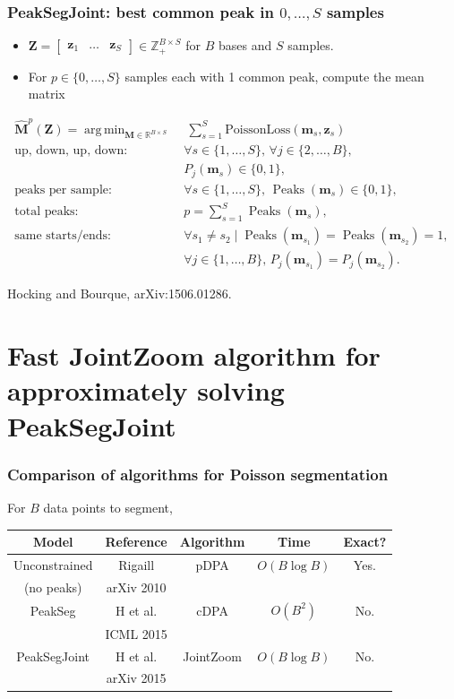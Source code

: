 \documentclass{beamer}
\DeclareMathOperator*{\argmin}{arg\,min}
\DeclareMathOperator*{\Peaks}{Peaks}
\newcommand{\RR}{\mathbb R}
\newcommand{\ZZ}{\mathbb Z}
\begin{document}
\begin{frame}
  \frametitle{PeakSegJoint: best common peak in $0, \dots, S$
    samples}

  \begin{itemize}
  \item $\mathbf Z = \left[
    \begin{array}{ccc}
      \mathbf z_1 & \dots & \mathbf z_S
    \end{array}
  \right]\in\ZZ_+^{B\times S}$ for $B$ bases and $S$ samples.
  \item For $p\in\{0,\dots, S\}$ samples each with 1 common peak,
    compute the mean matrix
  \end{itemize}
\vskip -0.5cm
\begin{align}
  \nonumber \mathbf{\hat M}^p(\mathbf Z)  =
  \argmin_{\mathbf M\in\RR^{B\times S}} &\ \ 
  \sum_{s=1}^S 
  \text{PoissonLoss}(\mathbf m_s, \mathbf z_s) 
  \\
  \text{up, down, up, down:}&\ \nonumber
  \forall s\in\{1, \dots, S\},\,
  \forall j\in\{2, \dots, B\},\\
  &\ P_j(\mathbf m_s) \in\{0, 1\},
  \\
  \text{peaks per sample:} &\ 
  \forall s\in\{1, \dots, S\},\, 
  \Peaks(\mathbf m_s)\in\{0, 1\},  
  \\
  \text{total peaks:}&\ 
  p = \sum_{s=1}^S \Peaks(\mathbf m_s),
  \\
  \text{same starts/ends:} \nonumber &\ \forall s_1\neq s_2\mid
  \Peaks(\mathbf m_{s_1})=\Peaks(\mathbf  m_{s_2})=1,\, \\
   &\ \forall j\in\{1, \dots, B\},\,
  P_j(\mathbf m_{s_1}) = P_j(\mathbf m_{s_2}).
\end{align}

Hocking and Bourque, arXiv:1506.01286.
  
\end{frame}

\section{Fast JointZoom algorithm for approximately solving
  PeakSegJoint}

\begin{frame}
  \frametitle{Comparison of algorithms for Poisson segmentation}

  For $B$ data points to segment,

  \vskip 1cm
  
  \begin{tabular}{ccccc}
    Model & Reference & Algorithm & Time & Exact?\\
    \hline
    Unconstrained & Rigaill  & pDPA & $O(B \log B)$ & Yes. \\
    (no peaks) & arXiv 2010\\
    \hline
    PeakSeg & H et al. & cDPA & $O(B^2)$ & No.\\
    & ICML 2015 \\
    \hline
    PeakSegJoint & H et al. & JointZoom & $O(B\log B)$ & No.\\
    & arXiv 2015
  \end{tabular}
  
\end{frame}
\end{document}
